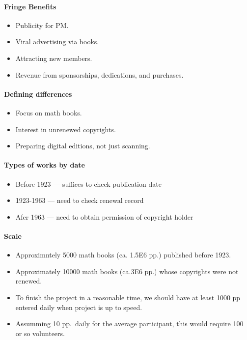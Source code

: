 \begin{itemize}
\paragraph{Fringe Benefits}

\begin{itemize}
\item
  Publicity for PM.
\item
  Viral advertising via books.
\item
  Attracting new members.
\item
  Revenue from sponsorships, dedications, and purchases.
\end{itemize}

\paragraph{Defining differences}

\begin{itemize}
\item
  Focus on math books.
\item
  Interest in unrenewed copyrights.
\item
  Preparing digital editions, not just scanning.
\end{itemize}

\paragraph{Types of works by date}

\begin{itemize}
\item
  Before 1923 --- suffices to check publication date
\item
  1923-1963 --- need to check renewal record
\item
  Afer 1963 --- need to obtain permission of copyright holder
\end{itemize}

\paragraph{Scale}

\begin{itemize}
\item
  Approximntely 5000 math books (ca. 1.5E6 pp.) published before 1923.
\item
  Approximately 10000 math books (ca.3E6 pp.) whose copyrights were not
  renewed.
\item
  To finish the project in a reasonable time, we should have at least
  1000 pp entered daily when project is up to speed.
\item
  Assumming 10 pp.~daily for the average participant, this would require
  100 or so volunteers.
\end{itemize}


\end{itemize}
